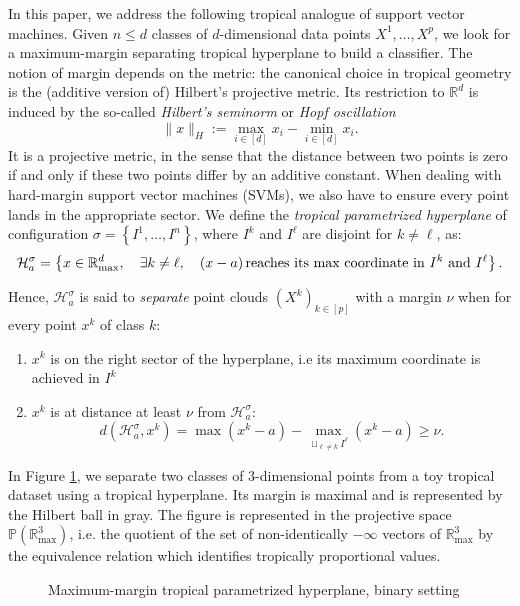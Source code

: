\documentclass[oneside,english,a4paper]{amsart}
\numberwithin{equation}{section}
\numberwithin{figure}{section}
\theoremstyle{plain}
\theoremstyle{definition}
\theoremstyle{plain}
\theoremstyle{remark}
\theoremstyle{plain}
\theoremstyle{definition}
\theoremstyle{definition}
\begin{document}
In this paper, we address the following tropical analogue of support
vector machines. Given $n\le d$ classes of $d$-dimensional data
points $X^{1},\ldots,X^{p}$, we look for a maximum-margin separating
tropical hyperplane to build a classifier. The notion of margin depends
on the metric: the canonical choice in tropical geometry is the (additive
version of) Hilbert's projective metric. Its restriction to $\mathbb{R}^{d}$
is induced by the so-called \emph{Hilbert's seminorm} or \emph{Hopf
oscillation}
\[
\lVert x\rVert_{H}:=\max_{i\in[d]}x_{i}-\min_{i\in[d]}x_{i}.
\]
It is a projective metric, in the sense that the distance between
two points is zero if and only if these two points differ by an additive
constant. When dealing with hard-margin support vector machines (SVMs),
we also have to ensure every point lands in the appropriate sector.
We define the \emph{tropical parametrized hyperplane} of configuration
$\sigma=\left\{I^{1},\ldots,I^{n}\right\}$, where $I^{k}$ and $I^{\ell}$
are disjoint for $k\ne\ell$, as:
\[
\mathcal{H}_{a}^{\sigma}=\left\{x\in\mathbb{R}_{\max}^{d},\quad\exists k\ne\ell,\quad(x-a)\,\text{reaches its max coordinate in \ensuremath{I^{k}} and \ensuremath{I^{\ell}}}\right\}.
\]

Hence, $\mathcal{H}_{a}^{\sigma}$ is said to \emph{separate} point
clouds $(X^{k})_{k\in[p]}$ with a margin $\nu$ when for every point
$x^{k}$ of class $k$:
\begin{enumerate}
\item $x^{k}$ is on the right sector of the hyperplane, i.e its maximum
coordinate is achieved in $I^{k}$
\item $x^{k}$ is at distance at least $\nu$ from $\mathcal{H}_{a}^{\sigma}$:
\begin{equation}
d(\mathcal{H}_{a}^{\sigma},x^{k})=\max(x^{k}-a)-\max_{\sqcup_{\ell\ne k}I^{\ell}}(x^{k}-a)\ge\nu.
\end{equation}
\end{enumerate}
In Figure \ref{MaxMarginHyperplane}, we separate two classes
of $3$-dimensional points from a toy tropical dataset using a tropical
hyperplane. Its margin is maximal and is represented by the Hilbert
ball in gray. The figure is represented in the projective space $\mathbb{P}\left(\mathbb{R}_{\text{max}}^{3}\right)$,
i.e. the quotient of the set of non-identically $-\infty$ vectors
of $\mathbb{R}_{\text{max}}^{3}$ by the equivalence relation which
identifies tropically proportional values.

\begin{figure}
\label{MaxMarginHyperplane}

\caption{Maximum-margin tropical parametrized hyperplane, binary setting}
\end{figure}
\end{document}
